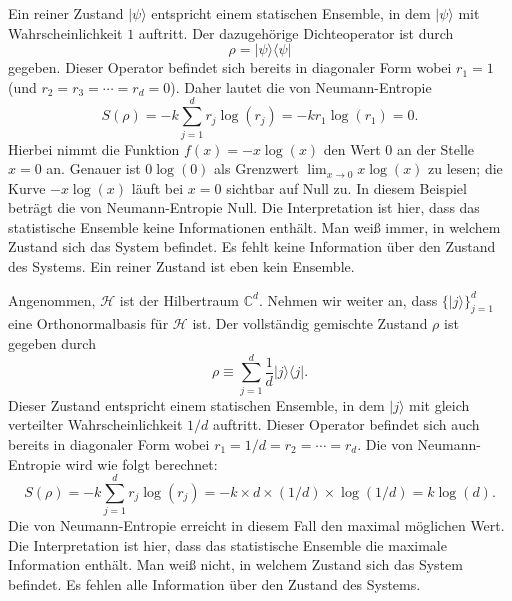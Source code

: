 \begin{beispiel}
  Ein reiner Zustand $|\psi\rangle$ entspricht einem statischen Ensemble, in dem $|\psi\rangle$ mit Wahrscheinlichkeit $1$ auftritt. Der dazugehörige Dichteoperator ist durch
  \begin{equation}
    \rho = |\psi\rangle\langle \psi|
  \end{equation}
  gegeben. Dieser Operator befindet sich bereits in diagonaler Form wobei $r_1 = 1$ (und $r_2 = r_3 = \cdots = r_d =0$). Daher lautet die von Neumann-Entropie
  \begin{equation}
    S(\rho) = -k\sum_{j=1}^d r_j\log(r_j) = -k r_1\log(r_1) = 0.
  \end{equation}
  Hierbei nimmt die Funktion $f(x) = -x\log(x)$ den Wert $0$ an der Stelle $x=0$ an. Genauer ist $0\log(0)$ als Grenzwert $\lim_{x\to 0} x\log(x)$ zu lesen; die Kurve $-x\log(x)$ läuft bei $x=0$ sichtbar auf Null zu. In diesem Beispiel beträgt die von Neumann-Entropie Null. Die Interpretation ist hier, dass das statistische Ensemble keine Informationen enthält. Man weiß immer, in welchem Zustand sich das System befindet. Es fehlt keine Information über den Zustand des Systems. Ein reiner Zustand ist eben kein Ensemble.
\end{beispiel}

\begin{beispiel}
  Angenommen, $\mathcal{H}$ ist der Hilbertraum $\mathbb{C}^d$. Nehmen wir weiter an, dass $\{|j\rangle \}_{j=1}^d$ eine Orthonormalbasis für $\mathcal{H}$ ist. Der vollständig gemischte Zustand $\rho$ ist gegeben durch
  \begin{equation}
    \rho \equiv \sum_{j=1}^d \frac{1}{d} |j\rangle\langle j|.
  \end{equation}
  Dieser Zustand entspricht einem statischen Ensemble, in dem $|j\rangle$ mit gleich verteilter Wahrscheinlichkeit $1/d$ auftritt. Dieser Operator befindet sich auch bereits in diagonaler Form wobei $r_1 = 1/d = r_2 = \cdots = r_d$. Die von Neumann-Entropie wird wie folgt berechnet:
  \begin{equation}
    S(\rho) = -k\sum_{j=1}^d r_j\log(r_j) = -k \times d \times  (1/d) \times \log(1/d) = k \log(d).
  \end{equation}
  Die von Neumann-Entropie erreicht in diesem Fall den maximal möglichen Wert. Die Interpretation ist hier, dass das statistische Ensemble die maximale Information enthält. Man weiß nicht, in welchem Zustand sich das System befindet. Es fehlen alle Information über den Zustand des Systems.
\end{beispiel}

